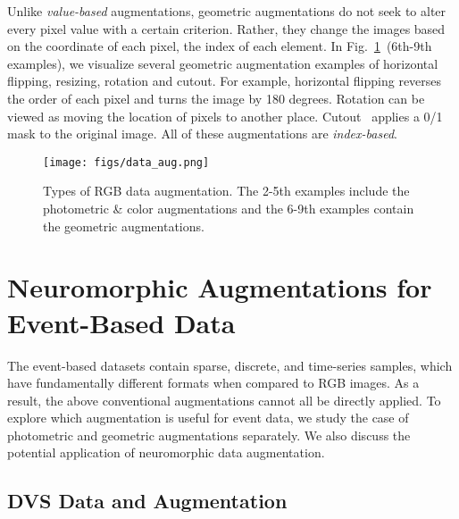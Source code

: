 \documentclass[runningheads]{llncs}
\newcommand{\bftab}{\fontseries{b}\selectfont}
\begin{document}
\noindent{\bftab Geometric Augmentations. }
Unlike \textit{value-based} augmentations,  geometric augmentations do not seek to alter every pixel value with a certain criterion. Rather, they change the images based on the coordinate of each pixel, \ie the index of each element. In Fig.~\ref{fig_data_aug}~(6th-9th examples), we visualize several geometric augmentation examples of horizontal flipping, resizing, rotation and cutout. 
For example, horizontal flipping reverses the order of each pixel and turns the image by 180 degrees. Rotation can be viewed as moving the location of pixels to another place. Cutout~\cite{devries2017cutout} applies a 0/1 mask to the original image. All of these augmentations are \textit{index-based}.


\begin{figure}[t]
    \centering
    \texttt{[image: figs/data\_aug.png]}
    \caption{Types of RGB data augmentation. The 2-5th examples include the photometric \& color augmentations and the 6-9th examples contain the geometric augmentations.}
    \label{fig_data_aug}
\end{figure}

\section{Neuromorphic Augmentations for Event-Based Data}

The event-based datasets contain sparse, discrete, and time-series samples, which have fundamentally different formats when compared to RGB images. 
As a result, the above conventional augmentations cannot all be directly applied. To explore which augmentation is useful for event data, we study the case of photometric and geometric augmentations separately. We also discuss the potential application of neuromorphic data augmentation. 

\subsection{DVS Data and Augmentation}
\end{document}
